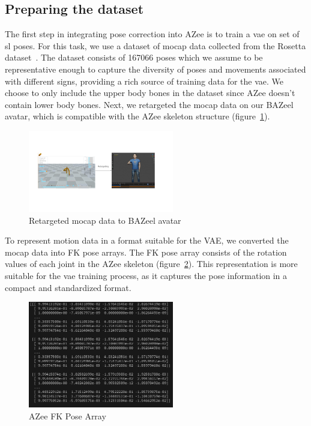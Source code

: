 \documentclass[../../main.tex]{subfiles}
\begin{document}
\subsection{Preparing the dataset}
\label{ch:pose_correction:pose_correction_with_azee:dataset}

The first step in integrating pose correction into AZee is to train a \gls{vae} on set of \gls{sl} poses. For this task, we use a dataset of mocap data collected from the Rosetta dataset~\cite{bertin2022rosetta}. The dataset consists of 167066 poses which we assume to be representative enough to capture the diversity of poses and movements associated with different signs, providing a rich source of training data for the \gls{vae}. We choose to only include the upper body bones in the dataset since AZee doesn't contain lower body bones. Next, we retargeted the mocap data on our BAZeel avatar, which is compatible with the AZee skeleton structure (figure~\ref{fig:retargeted}).

\begin{figure}
  \centering \includegraphics[width = 2.5in]{chapters/intermediate_blocks_pose_correction/images/retargeted.png}
  \caption{Retargeted mocap data to BAZeel avatar}
  \label{fig:retargeted}
\end{figure}


To represent motion data in a format suitable for the VAE, we converted the mocap data into FK pose arrays. The FK pose array consists of the rotation values of each joint in the AZee skeleton (figure~\ref{fig:azee_fk_pose}). This representation is more suitable for the \gls{vae} training process, as it captures the pose information in a compact and standardized format.

\begin{figure}
  \centering \includegraphics[width = 2.5in]{chapters/intermediate_blocks_pose_correction/images/azee_fk_pose.png}
  \caption{AZee FK Pose Array}
  \label{fig:azee_fk_pose}
\end{figure}
\end{document}
